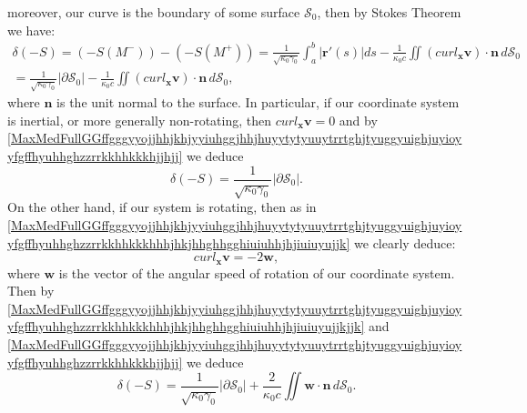 \documentclass{article}
\theoremstyle{definition}
\theoremstyle{remark}
\renewcommand{\vec}[1]{\mathbf{#1}}
\newcommand{\er}{\eqref}
\newcommand{\er}{\eqref}
\begin{document}
moreover, our curve is the boundary of some surface $\mathcal{S}_0$,
then by Stokes Theorem we have:
\begin{multline}\label{MaxMedFullGGffgggyyojjhhjkhjyyiuhggjhhjhuyytytyuuytrrtghjtyuggyuighjuyioyyfgffhyuhhghzzrrkkhhkkkhjjhjj}
\delta(-S)=\left(-S(M^-)\right)-
\left(-S(M^+)\right)=\frac{1}{\sqrt{\kappa_0\gamma_0}}\int_a^b
\left|\vec r'(s)\right|ds-\frac{1}{\kappa_0 c}\iint \left(curl_{\vec
x}\vec v\right)\cdot\vec n
\,d\mathcal{S}_0\\=\frac{1}{\sqrt{\kappa_0\gamma_0}}\left|\partial
\mathcal{S}_0\right|-\frac{1}{\kappa_0 c}\iint \left(curl_{\vec
x}\vec v\right)\cdot\vec n \,d\mathcal{S}_0,
\end{multline}
where $\vec n$ is the unit normal to the surface.
In particular, if our
coordinate system is inertial, or more generally non-rotating, then
$curl_{\vec x}\vec v=0$ and by
\er{MaxMedFullGGffgggyyojjhhjkhjyyiuhggjhhjhuyytytyuuytrrtghjtyuggyuighjuyioyyfgffhyuhhghzzrrkkhhkkkhjjhjj}
we deduce
\begin{equation}\label{MaxMedFullGGffgggyyojjhhjkhjyyiuhggjhhjhuyytytyuuytrrtghjtyuggyuighjuyioyyfgffhyuhhghzzrrkkhhkkkhjjhjjhjhhjjhjjh}
\delta(-S)=\frac{1}{\sqrt{\kappa_0\gamma_0}}\left|\partial
\mathcal{S}_0\right|.
\end{equation}
On the other hand, if our system is rotating, then as in
\er{MaxMedFullGGffgggyyojjhhjkhjyyiuhggjhhjhuyytytyuuytrrtghjtyuggyuighjuyioyyfgffhyuhhghzzrrkkhhkkkhhhjhkjhhghhgghiuiuhhjhjiuiuyujjk}
we clearly deduce:
\begin{equation}\label{MaxMedFullGGffgggyyojjhhjkhjyyiuhggjhhjhuyytytyuuytrrtghjtyuggyuighjuyioyyfgffhyuhhghzzrrkkhhkkkhhhjhkjhhghhgghiuiuhhjhjiuiuyujjkjjk}
curl_{\vec x}\vec v=-2\vec w,
\end{equation}
where $\vec w$ is the vector of the angular speed of rotation of our
coordinate system. Then by
\er{MaxMedFullGGffgggyyojjhhjkhjyyiuhggjhhjhuyytytyuuytrrtghjtyuggyuighjuyioyyfgffhyuhhghzzrrkkhhkkkhhhjhkjhhghhgghiuiuhhjhjiuiuyujjkjjk}
and
\er{MaxMedFullGGffgggyyojjhhjkhjyyiuhggjhhjhuyytytyuuytrrtghjtyuggyuighjuyioyyfgffhyuhhghzzrrkkhhkkkhjjhjj}
we deduce
\begin{equation}\label{MaxMedFullGGffgggyyojjhhjkhjyyiuhggjhhjhuyytytyuuytrrtghjtyuggyuighjuyioyyfgffhyuhhghzzrrkkhhkkkhjjhjjjjk}
\delta(-S)=\frac{1}{\sqrt{\kappa_0\gamma_0}}\left|\partial
\mathcal{S}_0\right|+\frac{2}{\kappa_0 c}\iint \vec w\cdot\vec n
\,d\mathcal{S}_0.
\end{equation}
\end{document}
